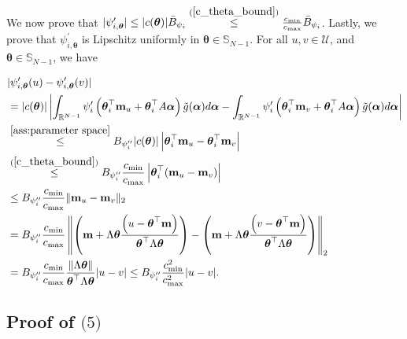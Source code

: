 \documentclass{article} %
\def\eqref#1{equation~\ref{#1}}
\renewcommand{\eqref}[1]{(\ref{#1})}
\begin{document}
We now prove that $|\psi^{\prime}_{i,\boldsymbol{\theta}}|\leq |c(\boldsymbol{\theta})|\bar{B}_{\psi_i}\overset{\eqref{c_theta_bound}}{\leq} \frac{c_{\min}}{c_{\max}}\bar{B}_{\psi_i}$. Lastly, we prove that $\psi^{\prime}_{i,\boldsymbol{\theta}}$ is Lipschitz uniformly in $\boldsymbol{\theta} \in \mathbb{S}_{N-1}$. For all $u,v \in \mathcal{U}$, and $\boldsymbol{\theta}\in \mathbb{S}_{N-1}$, we have

\begin{align*}
&|\psi^{\prime}_{i,\boldsymbol{\theta}}(u)-\psi^{\prime}_{i,\boldsymbol{\theta}}(v)| \\
&= |c(\boldsymbol{\theta})| \left|\int_{\mathbb{R}^{N-1}} \psi_i^{\prime}\left(\boldsymbol{\theta}_i^{\top}\mathbf{m}_u+\boldsymbol{\theta}_i^{\top}A \boldsymbol{\alpha}\right) \tilde{g}(\boldsymbol{\alpha})d\boldsymbol{\alpha}-\int_{\mathbb{R}^{N-1}} \psi_i^{\prime}\left(\boldsymbol{\theta}_i^{\top}\mathbf{m}_v+\boldsymbol{\theta}_i^{\top}A \boldsymbol{\alpha}\right) \tilde{g}(\boldsymbol{\alpha})d\boldsymbol{\alpha}\right|\\
& \overset{\cref{ass:parameter space}}{\leq} B_{\psi_i''} |c(\boldsymbol{\theta}) |\left|\boldsymbol{\theta}_i^{\top}\mathbf{m}_u-\boldsymbol{\theta}_i^{\top}\mathbf{m}_v\right|\\
& \overset{\eqref{c_theta_bound}}{\leq} B_{\psi_i''} \frac{c_{\min}}{c_{\max}} \left|\boldsymbol{\theta}_i^{\top}(\mathbf{m}_u-\mathbf{m}_v)\right|\\
& \leq B_{\psi_i''} \frac{c_{\min}}{c_{\max}} \|\mathbf{m}_u-\mathbf{m}_v\|_2\\
& = B_{\psi_i''} \frac{c_{\min}}{c_{\max}} \left\|\left(\mathbf{m}+\Lambda \boldsymbol{\theta} \frac{\left(u-\boldsymbol{\theta}^{\top} \mathbf{m}\right)}{\boldsymbol{\theta}^{\top} \Lambda \boldsymbol{\theta}} \right)-\left(\mathbf{m}+\Lambda \boldsymbol{\theta} \frac{\left(v-\boldsymbol{\theta}^{\top} \mathbf{m}\right)}{\boldsymbol{\theta}^{\top} \Lambda \boldsymbol{\theta}} \right)\right\|_2\\
& = B_{\psi_i''} \frac{c_{\min}}{c_{\max}}\frac{\|\Lambda \boldsymbol{\theta}\|}{\boldsymbol{\theta}^{\top} \Lambda \boldsymbol{\theta}} |u-v|\leq B_{\psi_i''} \frac{c_{\min}^2}{c_{\max}^2} |u-v|.
\end{align*}


\subsection{Proof of $\textit{(5)}$}
\end{document}
